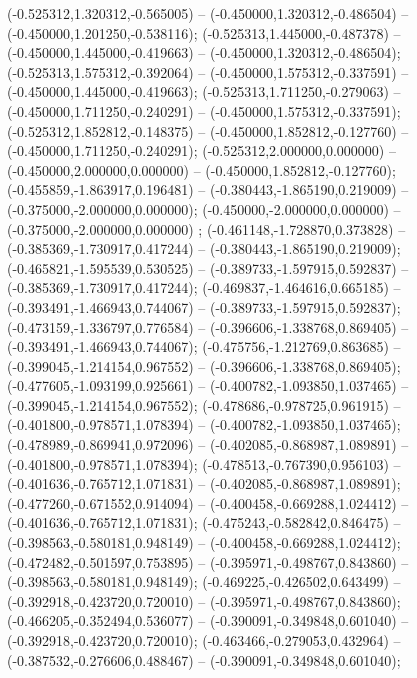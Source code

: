  (-0.525312,1.320312,-0.565005) -- (-0.450000,1.320312,-0.486504) -- (-0.450000,1.201250,-0.538116);
 (-0.525313,1.445000,-0.487378) -- (-0.450000,1.445000,-0.419663) -- (-0.450000,1.320312,-0.486504);
 (-0.525313,1.575312,-0.392064) -- (-0.450000,1.575312,-0.337591) -- (-0.450000,1.445000,-0.419663);
 (-0.525313,1.711250,-0.279063) -- (-0.450000,1.711250,-0.240291) -- (-0.450000,1.575312,-0.337591);
 (-0.525312,1.852812,-0.148375) -- (-0.450000,1.852812,-0.127760) -- (-0.450000,1.711250,-0.240291);
 (-0.525312,2.000000,0.000000) -- (-0.450000,2.000000,0.000000) -- (-0.450000,1.852812,-0.127760);
 (-0.455859,-1.863917,0.196481) -- (-0.380443,-1.865190,0.219009) -- (-0.375000,-2.000000,0.000000);
 (-0.450000,-2.000000,0.000000) -- (-0.375000,-2.000000,0.000000) ;
 (-0.461148,-1.728870,0.373828) -- (-0.385369,-1.730917,0.417244) -- (-0.380443,-1.865190,0.219009);
 (-0.465821,-1.595539,0.530525) -- (-0.389733,-1.597915,0.592837) -- (-0.385369,-1.730917,0.417244);
 (-0.469837,-1.464616,0.665185) -- (-0.393491,-1.466943,0.744067) -- (-0.389733,-1.597915,0.592837);
 (-0.473159,-1.336797,0.776584) -- (-0.396606,-1.338768,0.869405) -- (-0.393491,-1.466943,0.744067);
 (-0.475756,-1.212769,0.863685) -- (-0.399045,-1.214154,0.967552) -- (-0.396606,-1.338768,0.869405);
 (-0.477605,-1.093199,0.925661) -- (-0.400782,-1.093850,1.037465) -- (-0.399045,-1.214154,0.967552);
 (-0.478686,-0.978725,0.961915) -- (-0.401800,-0.978571,1.078394) -- (-0.400782,-1.093850,1.037465);
 (-0.478989,-0.869941,0.972096) -- (-0.402085,-0.868987,1.089891) -- (-0.401800,-0.978571,1.078394);
 (-0.478513,-0.767390,0.956103) -- (-0.401636,-0.765712,1.071831) -- (-0.402085,-0.868987,1.089891);
 (-0.477260,-0.671552,0.914094) -- (-0.400458,-0.669288,1.024412) -- (-0.401636,-0.765712,1.071831);
 (-0.475243,-0.582842,0.846475) -- (-0.398563,-0.580181,0.948149) -- (-0.400458,-0.669288,1.024412);
 (-0.472482,-0.501597,0.753895) -- (-0.395971,-0.498767,0.843860) -- (-0.398563,-0.580181,0.948149);
 (-0.469225,-0.426502,0.643499) -- (-0.392918,-0.423720,0.720010) -- (-0.395971,-0.498767,0.843860);
 (-0.466205,-0.352494,0.536077) -- (-0.390091,-0.349848,0.601040) -- (-0.392918,-0.423720,0.720010);
 (-0.463466,-0.279053,0.432964) -- (-0.387532,-0.276606,0.488467) -- (-0.390091,-0.349848,0.601040);
